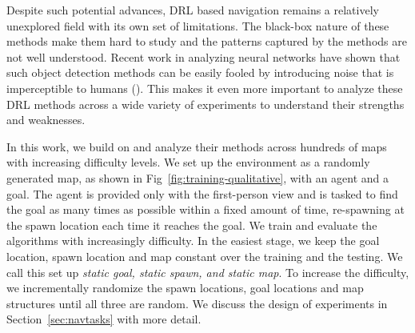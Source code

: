 Despite such potential advances, DRL based navigation remains a relatively unexplored field with its own set of limitations. 
The black-box nature of these methods make them hard to study and the patterns captured by the methods are not well understood. 
Recent work in analyzing neural networks have shown that such object detection methods can be easily fooled by introducing noise that is imperceptible to humans (\cite{NgYoClCVPR2015}). 
This makes it even more important to analyze these DRL methods across a wide variety of experiments to understand their strengths and weaknesses.


In this work, we build on \cite{MiPaViICLR2017} and analyze their methods across hundreds of maps with increasing difficulty levels. 
We set up the environment as a randomly generated map, as shown in Fig~\ref{fig:training-qualitative}, with an agent and a goal.
The agent is provided only with the first-person view and is tasked to find the goal as many times as possible within a fixed amount of time, re-spawning at the spawn location each time it reaches the goal.
We train and evaluate the algorithms with increasingly difficulty.
In the easiest stage, we keep the goal location, spawn location and map constant over the training and the testing.
We call this set up \emph{static goal, static spawn, and static map}.
To increase the difficulty, we incrementally randomize the spawn locations, goal locations and map structures until all three are random.
We discuss the design of experiments in Section~\ref{sec:navtasks} with more detail.

